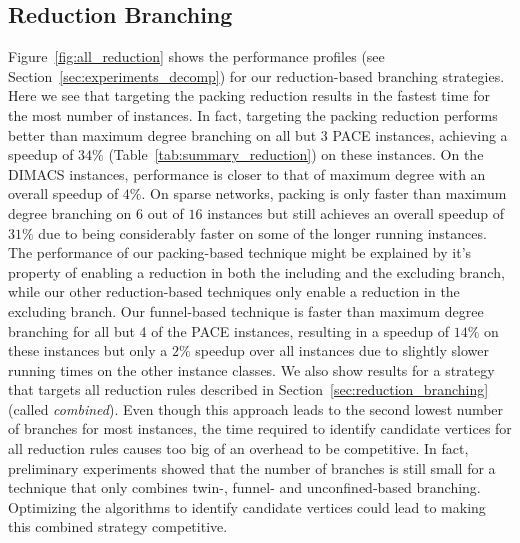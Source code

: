 \documentclass[a4paper,UKenglish,cleveref, autoref, thm-restate]{lipics-v2021}
\begin{document}
\subsection{Reduction Branching}
Figure~\ref{fig:all_reduction} shows the performance profiles (see
Section~\ref{sec:experiments_decomp}) for our reduction-based branching strategies. Here we see that targeting the packing reduction
results in the fastest time for the most number of instances. In fact, targeting
the packing reduction performs better than maximum degree branching on all but 3
PACE instances, achieving a speedup of $34\%$ (Table~\ref{tab:summary_reduction}) on these instances. On the DIMACS
instances, performance is closer to that of maximum degree with an overall
speedup of $4\%$. On sparse networks, packing is only faster than maximum degree
branching on $6$ out of $16$ instances but still achieves an overall speedup of
$31\%$ due to being considerably faster on some of the longer running instances.
The performance of our packing-based technique might be explained by it's
property of enabling a reduction in both the including and the excluding branch,
while our other reduction-based techniques only enable a reduction in the
excluding branch.
Our funnel-based technique is faster than maximum degree branching for all but 4
of the PACE instances, resulting in a speedup of $14\%$ on these instances but
only a $2\%$ speedup over all instances due to slightly slower running times on
the other instance classes. We also show results for a strategy that targets all reduction rules
described in Section~\ref{sec:reduction_branching} (called \emph{combined}). Even though this approach
leads to the second lowest number of branches for most instances, the time required to
identify candidate vertices for all reduction rules causes too big of an
overhead to be competitive. In fact, preliminary experiments showed that the
number of branches is still small for a technique that only combines twin-,
funnel- and unconfined-based branching. Optimizing the algorithms to identify candidate
vertices could lead to making this combined strategy
competitive.


\end{document}
